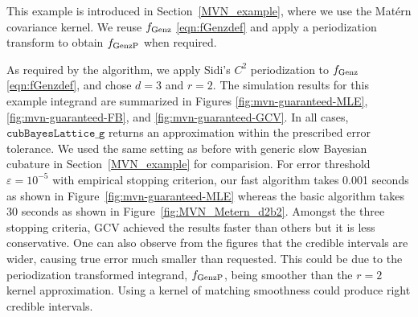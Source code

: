 \documentclass{iitthesis}          %
\newcommand{\hmu}{\widehat{\mu}}
\newcommand{\code}[1]{\texttt{#1}}
\def\abs#1{\ensuremath{\left \lvert #1 \right \rvert}}
\newcommand\figref{Figure~\ref}
\newcommand\secref{Section~\ref}
\begin{document}



This example is introduced in Section~\ref{MVN_example}, where we use the Mat\'ern covariance kernel.  We reuse $f_{\textup{Genz}}$ \eqref{eqn:fGenzdef} and apply a periodization transform to obtain $f_{\textup{GenzP}}$ when required.

\Subsection{Using \code{cubBayesLattice\_g}}
As required by the algorithm, we apply Sidi's $C^2$  periodization to $ f_{\textup{Genz}}$ \eqref{eqn:fGenzdef}, and chose $d=3$ and $r=2$. The simulation results for this example integrand  are summarized in Figures \ref{fig:mvn-guaranteed-MLE}, \ref{fig:mvn-guaranteed-FB}, and \ref{fig:mvn-guaranteed-GCV}.  In all cases, $\code{cubBayesLattice\_g}$ returns an approximation within the prescribed error tolerance. We used the same setting as before with generic slow Bayesian cubature in \secref{MVN_example} for comparision. For error threshold $\varepsilon=10^{-5}$ with empirical stopping criterion, our fast algorithm takes 0.001 seconds as shown in \figref{fig:mvn-guaranteed-MLE} whereas the basic algorithm takes 30 seconds as shown in \figref{fig:MVN_Metern_d2b2}. 
Amongst the three stopping criteria, GCV achieved the results faster than others but it is less conservative. 
One can also observe from the figures that the credible intervals are wider, causing true error much smaller than requested.
This could be due to the periodization transformed integrand, $f_\textup{GenzP}$, being smoother than the $r=2$ kernel approximation. Using a kernel of matching smoothness could produce right credible intervals.
\end{document}
